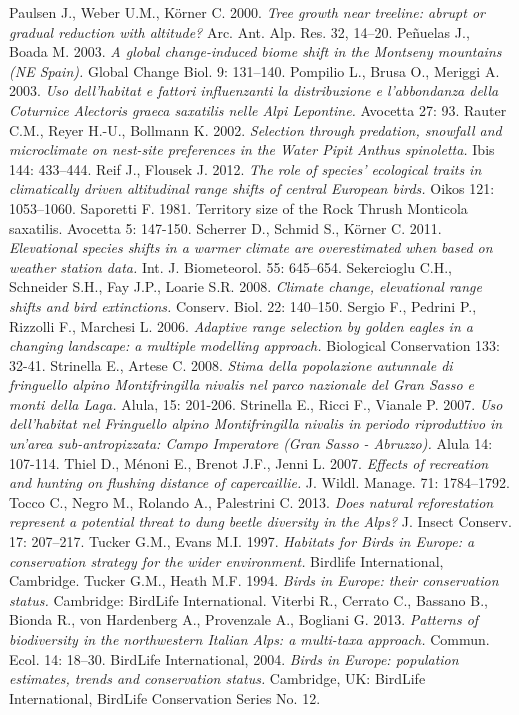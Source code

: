 \documentclass[10pt,twoside,openany,x11names,svgnames,italian,a5paper,dvipsnames,table]{memoir}
\begin{document}
\begin{thebibliography}{9}
Paulsen J., Weber U.M., Körner C. 2000. \emph{Tree growth near treeline: abrupt or gradual reduction with altitude?} Arc. Ant. Alp. Res. 32, 14–20.
Peñuelas J., Boada M. 2003. \emph{A global change-induced biome shift in the Montseny mountains (NE Spain).} Global Change Biol. 9: 131–140.
Pompilio L., Brusa O., Meriggi A. 2003. \emph{Uso dell’habitat e fattori influenzanti la distribuzione e l’abbondanza della Coturnice \emph{Alectoris graeca saxatilis} nelle Alpi Lepontine.} Avocetta 27: 93.
Rauter C.M., Reyer H.-U., Bollmann K. 2002. \emph{Selection through predation, snowfall and microclimate on nest-site preferences in the Water Pipit \emph{Anthus spinoletta}.} Ibis 144:  433–444.
Reif J., Flousek J. 2012. \emph{The role of species’ ecological traits in climatically driven altitudinal range shifts of central European birds.} Oikos 121: 1053–1060.
Saporetti F. 1981. Territory size of the Rock Thrush Monticola saxatilis. Avocetta 5: 147-150.
Scherrer D., Schmid S., Körner C. 2011. \emph{Elevational species shifts in a warmer climate are overestimated when based on weather station data.} Int. J. Biometeorol. 55: 645–654.
Sekercioglu C.H., Schneider S.H., Fay J.P., Loarie S.R. 2008. \emph{Climate change, elevational range shifts and bird extinctions.} Conserv. Biol. 22: 140–150.
Sergio F., Pedrini P., Rizzolli F., Marchesi L. 2006. \emph{Adaptive range selection by golden eagles in a changing landscape: a multiple modelling approach.} Biological Conservation 133: 32-41.
Strinella E., Artese C. 2008. \emph{Stima della popolazione autunnale di fringuello alpino \emph{Montifringilla nivalis} nel parco nazionale del Gran Sasso e monti della Laga.} Alula, 15: 201-206.
Strinella E., Ricci F., Vianale P. 2007. \emph{Uso dell'habitat nel Fringuello alpino \emph{Montifringilla nivalis} in periodo riproduttivo in un'area sub-antropizzata: Campo Imperatore (Gran Sasso - Abruzzo).} Alula 14: 107-114.
Thiel D., Ménoni E., Brenot J.F., Jenni L. 2007. \emph{Effects of recreation and hunting on flushing distance of capercaillie.} J. Wildl. Manage. 71: 1784–1792.
Tocco C., Negro M., Rolando A., Palestrini C. 2013. \emph{Does natural reforestation represent a potential threat to dung beetle diversity in the Alps?} J. Insect Conserv. 17: 207–217.
Tucker G.M., Evans M.I. 1997. \emph{Habitats for Birds in Europe: a conservation strategy for the wider environment.} Birdlife International, Cambridge.
Tucker G.M., Heath M.F. 1994. \emph{Birds in Europe: their conservation status.} Cambridge: BirdLife International.
Viterbi R., Cerrato C., Bassano B., Bionda R., von Hardenberg A., Provenzale A., Bogliani G. 2013. \emph{Patterns of biodiversity in the northwestern Italian Alps: a multi-taxa approach.} Commun. Ecol. 14: 18–30.
 BirdLife International, 2004. \emph{Birds in Europe: population estimates, trends and conservation status.} Cambridge, UK: BirdLife International, BirdLife Conservation Series No. 12.
\end{thebibliography}
\end{document}
